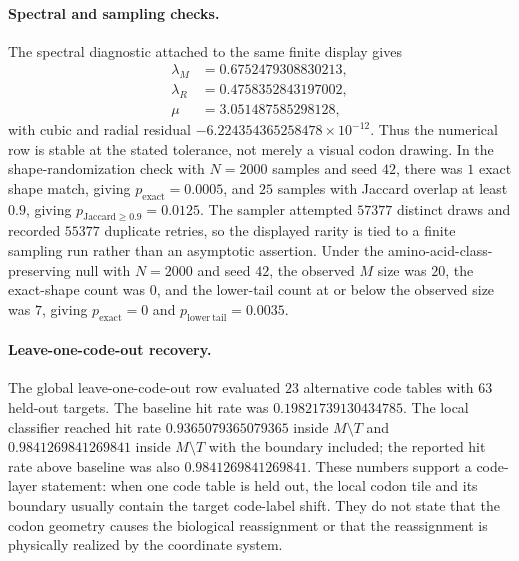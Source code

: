 \paragraph{Spectral and sampling checks.}
The spectral diagnostic attached to the same finite display gives
$$
\begin{aligned}
\lambda_M&=0.6752479308830213,\\
\lambda_R&=0.4758352843197002,\\
\mu&=3.051487585298128,
\end{aligned}
$$
with cubic and radial residual $-6.224354365258478\times 10^{-12}$.  Thus the numerical row is stable at the stated tolerance, not merely a visual codon drawing.  In the shape-randomization check with $N=2000$ samples and seed $42$, there was $1$ exact shape match, giving $p_{\mathrm{exact}}=0.0005$, and $25$ samples with Jaccard overlap at least $0.9$, giving $p_{\mathrm{Jaccard}\ge 0.9}=0.0125$.  The sampler attempted $57377$ distinct draws and recorded $55377$ duplicate retries, so the displayed rarity is tied to a finite sampling run rather than an asymptotic assertion.  Under the amino-acid-class-preserving null with $N=2000$ and seed $42$, the observed $M$ size was $20$, the exact-shape count was $0$, and the lower-tail count at or below the observed size was $7$, giving $p_{\mathrm{exact}}=0$ and $p_{\mathrm{lower\ tail}}=0.0035$.

\paragraph{Leave-one-code-out recovery.}
The global leave-one-code-out row evaluated $23$ alternative code tables with $63$ held-out targets.  The baseline hit rate was $0.19821739130434785$.  The local classifier reached hit rate $0.9365079365079365$ inside $M\setminus T$ and $0.9841269841269841$ inside $M\setminus T$ with the boundary included; the reported hit rate above baseline was also $0.9841269841269841$.  These numbers support a code-layer statement: when one code table is held out, the local codon tile and its boundary usually contain the target code-label shift.  They do not state that the codon geometry causes the biological reassignment or that the reassignment is physically realized by the coordinate system.

